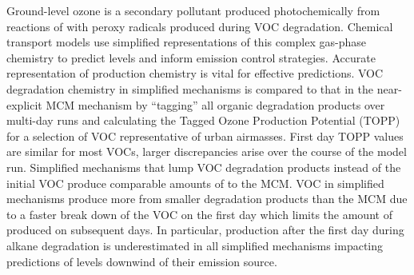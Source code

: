 Ground-level ozone is a secondary pollutant produced photochemically from reactions of  with peroxy radicals produced during VOC degradation. 
Chemical transport models use simplified representations of this complex gas-phase chemistry to predict  levels and inform emission control strategies. 
Accurate representation of  production chemistry is vital for effective predictions.
VOC degradation chemistry in simplified mechanisms is compared to that in the near-explicit MCM mechanism by ``tagging'' all organic degradation products over multi-day runs and calculating the Tagged Ozone Production Potential (TOPP) for a selection of VOC representative of urban airmasses.
First day TOPP values are similar for most VOCs, larger discrepancies arise over the course of the model run.
Simplified mechanisms that lump VOC degradation products instead of the initial VOC produce comparable amounts of  to the MCM.
VOC in simplified mechanisms produce more  from smaller degradation products than the MCM due to a faster break down of the VOC on the first day which limits the amount of  produced on subsequent days.
In particular,  production after the first day during alkane degradation is underestimated in all simplified mechanisms impacting predictions of  levels downwind of their emission source.
